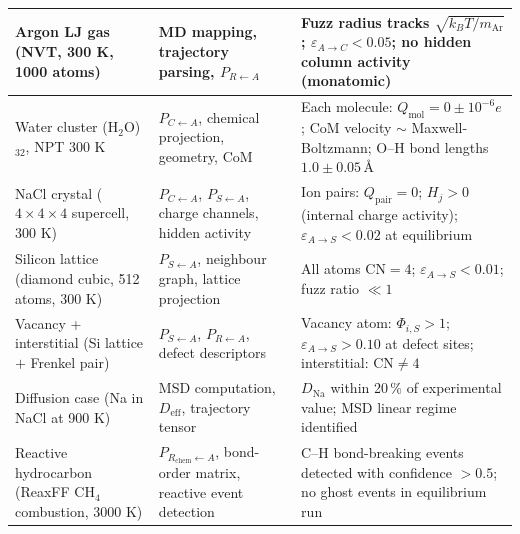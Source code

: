 \documentclass[11pt, a4paper, oneside]{article}
\newcommand{\FuzzRatio}{\Phi_{i,S}}
\begin{document}
\begin{appendices}
\begin{longtable}{p{4.5cm} p{4.5cm} p{5.5cm}}
  Argon LJ gas\newline
  (NVT, 300 K, 1000 atoms)
  &
  MD mapping, trajectory parsing, $P_{R \leftarrow A}$
  &
  Fuzz radius tracks $\sqrt{k_B T / m_{\mathrm{Ar}}}$;
  $\varepsilon_{A \to C} < 0.05$;
  no hidden column activity (monatomic) \\
  \midrule

  Water cluster\newline
  (H$_2$O)$_{32}$, NPT 300 K
  &
  $P_{C \leftarrow A}$, chemical projection, geometry, CoM
  &
  Each molecule: $Q_{\mathrm{mol}} = 0 \pm 10^{-6}e$;
  CoM velocity $\sim$ Maxwell-Boltzmann;
  O--H bond lengths $1.0 \pm 0.05$\,\AA \\
  \midrule

  NaCl crystal\newline
  ($4 \times 4 \times 4$ supercell, 300 K)
  &
  $P_{C \leftarrow A}$, $P_{S \leftarrow A}$, charge channels,
  hidden activity
  &
  Ion pairs: $Q_{\mathrm{pair}} = 0$;
  $H_j > 0$ (internal charge activity);
  $\varepsilon_{A \to S} < 0.02$ at equilibrium \\
  \midrule

  Silicon lattice\newline
  (diamond cubic, 512 atoms, 300 K)
  &
  $P_{S \leftarrow A}$, neighbour graph, lattice projection
  &
  All atoms $\mathrm{CN} = 4$;
  $\varepsilon_{A \to S} < 0.01$;
  fuzz ratio $\ll 1$ \\
  \midrule

  Vacancy + interstitial\newline
  (Si lattice $+$ Frenkel pair)
  &
  $P_{S \leftarrow A}$, $P_{R \leftarrow A}$, defect descriptors
  &
  Vacancy atom: $\FuzzRatio > 1$;
  $\varepsilon_{A \to S} > 0.10$ at defect sites;
  interstitial: $\mathrm{CN} \neq 4$ \\
  \midrule

  Diffusion case\newline
  (Na in NaCl at 900 K)
  &
  MSD computation, $D_{\mathrm{eff}}$, trajectory tensor
  &
  $D_{\mathrm{Na}}$ within 20\,\% of experimental value;
  MSD linear regime identified \\
  \midrule

  Reactive hydrocarbon\newline
  (ReaxFF CH$_4$ combustion, 3000 K)
  &
  $P_{R_{\mathrm{chem}} \leftarrow A}$, bond-order matrix,
  reactive event detection
  &
  C--H bond-breaking events detected with
  confidence $> 0.5$;
  no ghost events in equilibrium run \\
  \midrule


\end{longtable}
\end{appendices}
\end{document}
